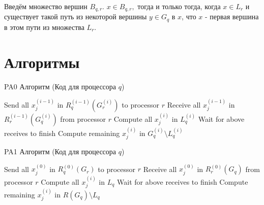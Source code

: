 \documentclass[a4paper,12pt]{report}
\begin{document}
    Введём множество вершин $B_{q,r}$. $x \in B_{q,r},$ тогда и только тогда, когда $x \in L_r$ и существует такой путь из некоторой вершины $y \in G_q$ в $x$, что $x$ - первая вершина в этом пути из множества $L_r$.

    \section{ Алгоритмы }

    \begin{algorithm}
    \caption{PA0 Алгоритм (Код для процессора $q$)}
    \label{algo:PA0}
    \begin{algorithmic}[1]
    
            \State Send all $x^{(i-1)}_j$ in $R^{(i-1)}_q(G^{(i)}_r)$ to processor $r$
        \EndFor
            \State Receive all $x^{(i-1)}_j$ in $R^{(i-1)}_r(G^{(i)}_q)$ from processor $r$
        \EndFor
        \State Compute all $x^{(i)}_j$ in $L^{(i)}_q$
        \State Wait for above receives to finish
        \State Compute remaining $x^{(i)}_j$ in $G^{(i)}_q \setminus L^{(i)}_q$
    \EndFor
    
    \end{algorithmic}
    \end{algorithm}

    \begin{algorithm}
    \caption{PA1 Алгоритм (Код для процессора $q$)}
    \label{algo:segment}
    \begin{algorithmic}[1]
            \State Send all $x^{(0)}_j$ in $R^{(0)}_q(G_r)$ to processor $r$
        \EndFor
            \State Receive all $x^{(0)}_j$ in $R^{(0)}_r(G_q)$ from processor $r$
        \EndFor
            \State Compute all $x^{(i)}_j$ in $L_q$
        \EndFor
        \State Wait for above receives to finish
            \State Compute remaining $x^{(i)}_j$ in $R(G_q) \setminus L_q$
        \EndFor
    \end{algorithmic}
    \end{algorithm}
\end{document}
